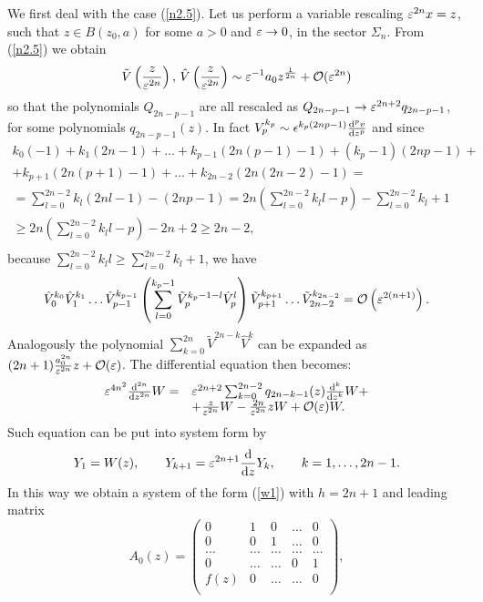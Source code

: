 \documentclass{amsart}
\theoremstyle{definition}
\theoremstyle{remark}
\theoremstyle{remark}
\begin{document}
We first deal with the case (\ref{n2.5}). Let us perform a variable
rescaling $\varepsilon^{2n} x=z$, such that $z\in B(z_0,a)$ for some $a>0$
and $\varepsilon\to 0$, in the sector $\Sigma_n$. From (\ref{n2.5}) we obtain
$$
\tilde V\left({z\over\varepsilon^{2n}}\right),\,
\hat V\left({z\over\varepsilon^{2n}}\right) \sim
\varepsilon^{-1} a_0 z^{1\over 2n} + {\mathcal O}(\varepsilon^{2n})
$$
so that the polynomials $Q_{2n-p-1}$ are all rescaled as
$Q_{2n-p-1}\to \varepsilon^{2n+2} q_{2n-p-1}$, for some polynomials
$q_{2n-p-1}(z)$. In fact
$V_p^{k_p} \sim \epsilon^{k_p(2np-1)} {{\rm d}^p v\over{\rm d}z^p}$
and since
$$
\begin{array}{l}
k_0 (-1)+k_1(2n-1)+\ldots+k_{p-1}(2n(p-1)-1)+(k_p-1)(2np-1)+\\
+k_{p+1}(2n(p+1)-1)+ \ldots+ k_{2n-2}(2n(2n-2)-1)=\\
=\sum_{l=0}^{2n-2} k_l(2nl-1)-(2n p-1)=
2n\left(\sum_{l=0}^{2n-2} k_l l -p\right)-\sum_{l=0}^{2n-2} k_l +1\\
\geq 2n\left(\sum_{l=0}^{2n-2} k_l l -p\right)-2n+2\geq 2n-2,\\
\end{array}
$$
because $\sum_{l=0}^{2n-2} k_l l\geq \sum_{l=0}^{2n-2} k_l+1$, we have
$$
{\hat V}_0^{k_0} {\hat V}_1^{k_1}\dots {\hat V}_{p-1}^{k_{p-1}}
\left(\sum_{l=0}^{k_p-1} {\tilde V}_{p}^{k_{p}-1-l}
{\hat V}_{p}^{l}\right)
{\tilde V}_{p+1}^{k_{p+1}}\dots {\tilde V}_{2n-2}^{k_{2n-2}}=
{\mathcal O}\left(\varepsilon^{2(n+1)}\right).
$$
Analogously the polynomial $\sum_{k=0}^{2n}{\tilde V}^{2n-k}{\hat V}^{k}$
can be expanded as $(2n+1){a_0^{2n}\over\varepsilon^{2n}} z+
{\mathcal O}(\varepsilon)$. The differential equation then becomes:
\begin{equation}\begin{array}{ll}
\varepsilon^{4 n^2} {{\rm d}^{2n}\over{\rm d} z^{2n}}W=& \varepsilon^{2n+2}
\sum_{k=0}^{2n-2} q_{2n-k-1}(z){{\rm d}^{k}\over{\rm d} z^{k}}W+\\
&+ {z\over\varepsilon^{2n}} W - {2n\over\varepsilon^{2n}} z W +{\mathcal O}(\varepsilon) W.\\
\end{array}\end{equation}
Such equation can be put into system form by
$$
Y_1=  W(z),\qquad Y_{k+1}= \varepsilon^{2n+1} {{\rm d}\over{\rm d} z}Y_k,
\qquad k=1,\dots,2n-1.
$$
In this way we obtain a system of the form (\ref{w1}) with $h=2n+1$ and
leading matrix
\begin{equation}
A_0(z)=\left(\begin{array}{ccccc}
0&1&0&\dots&0\\
0&0&1&\dots&0\\
\dots&\dots&\dots&\dots&\dots\\
0&\dots&\dots&0&1\\
f(z)&0&\dots&\dots&0\\
\end{array}\right),
\label{mata0}\end{equation}
\end{document}
